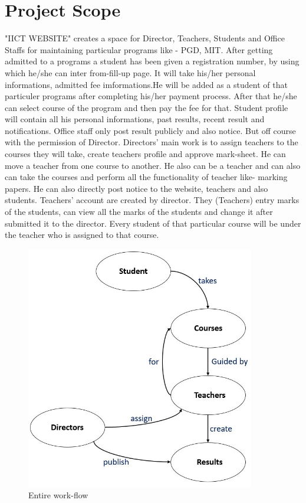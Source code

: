 \documentclass{scrreprt}
\begin{document}
	\section{Project Scope}
	"IICT WEBSITE" creates a space for Director, Teachers, Students and Office Staffs for maintaining particular programs like - PGD, MIT. 
	\newline
	After getting admitted to a programs a student has been given a registration number, by using which he/she can inter from-fill-up page. It will take his/her personal informations, admitted fee imformations.He will be added as a student of that particuler programs after completing his/her payment process. After that he/she can select course of the program and then pay the fee for that. Student profile will contain all his personal informations, past results, recent result and notifications.
	\newline
	Office staff only post result publicly and also notice. But off course with the permission of Director.  
	\newline
	Directors' main work is to assign teachers to the courses they will take, create teachers profile and approve mark-sheet. He can move a teacher from one course to another. He also can be a teacher and can also can take the courses and perform all the functionality of teacher like- marking papers. He can also directly post notice to the website, teachers and also students.
	\newline
	Teachers' account are created by director. They (Teachers) entry marks of the students, can view all the marks of the students and change it after submitted it to the director. Every student of that particular course will be under the teacher who is assigned to that course. 
	\newline
	\begin{figure}
		\centering
		\includegraphics[width=10cm]{1.JPG}
		\caption{Entire work-flow}
		\label{fig:IICT WEBSITE}
	\end{figure}
\end{document}

